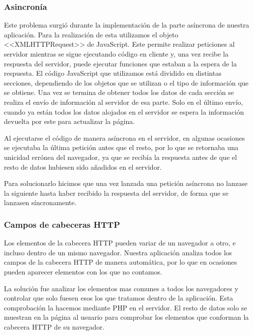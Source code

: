 \subsubsection{Asincronía}
Este problema surgió durante la implementación de la parte asíncrona de nuestra aplicación. Para la realización de esta utilizamos el objeto  <<XMLHTTPRequest>> de JavaScript. Este permite realizar peticiones al servidor mientras se sigue ejecutando código en cliente y, una vez recibe la respuesta del servidor, puede ejecutar funciones que estaban a la espera de la respuesta. El código JavaScript que utilizamos está dividido en distintas secciones, dependiendo de los objetos que se utilizan o el tipo de información que se obtiene. Una vez se termina de obtener todos los datos de cada sección se realiza el envío de información al servidor de esa parte. Solo en el último envío, cuando ya están todos los datos alojados en el servidor se espera la información devuelta por este para actualizar la página.\par 
Al ejecutarse el código de manera asíncrona en el servidor, en algunas ocasiones se ejecutaba la última petición antes que el resto, por lo que se retornaba una unicidad errónea del navegador, ya que se recibía la respuesta antes de que el resto de datos hubiesen sido añadidos en el servidor.\par 
Para solucionarlo hicimos que una vez lanzada una petición asíncrona no lanzase la siguiente hasta haber recibido la respuesta del servidor, de forma que se lanzasen síncronamente.
\subsubsection{Campos de cabeceras HTTP}
Los elementos de la cabecera HTTP pueden variar de un navegador a otro, e incluso dentro de un mismo navegador. Nuestra aplicación analiza todos los campos de la cabecera HTTP de manera automática, por lo que en ocasiones pueden aparecer elementos con los que no contamos.\par 
La solución fue analizar los elementos mas comunes a todos los navegadores y controlar que solo fuesen esos los que tratamos dentro de la aplicación. Esta comprobación la hacemos mediante PHP en el servidor. El resto de datos solo se muestran en la página al usuario para comprobar los elementos que conforman la cabecera HTTP de su navegador.
